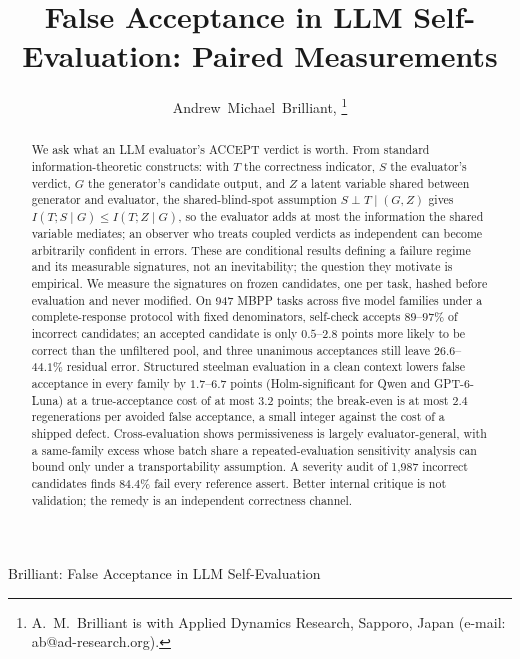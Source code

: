 \documentclass[a4paper,journal]{IAENGtran}
\begin{document}
\title{False Acceptance in LLM Self-Evaluation: Paired Measurements}

\author{Andrew~Michael~Brilliant,
\thanks{A.~M.~Brilliant is with Applied Dynamics Research, Sapporo, Japan (e-mail: ab@ad-research.org).}%
}

%
{Brilliant: False Acceptance in LLM Self-Evaluation}

\maketitle

\pagestyle{empty}
\thispagestyle{empty}



\begin{abstract}
We ask what an LLM evaluator's ACCEPT verdict is worth. From standard
information-theoretic constructs: with $T$ the correctness indicator, $S$ the
evaluator's verdict, $G$ the generator's candidate output, and $Z$ a latent
variable shared between generator and evaluator, the shared-blind-spot assumption
$S\perp T\mid(G,Z)$ gives
$I(T;S\mid G)\leq I(T;Z\mid G)$, so the evaluator adds at most the information
the shared variable mediates; an observer who treats coupled verdicts as
independent can become arbitrarily confident in errors. These are conditional
results defining a failure regime and its measurable signatures, not an
inevitability; the question they motivate is empirical. We measure the
signatures on frozen candidates, one per task, hashed before evaluation and
never modified. On 947 MBPP tasks across five model families under a
complete-response protocol with fixed denominators, self-check accepts
$89$--$97\%$ of incorrect candidates; an accepted candidate is only
$0.5$--$2.8$ points more likely to be correct than the unfiltered pool, and
three unanimous acceptances still leave $26.6$--$44.1\%$ residual error.
Structured steelman evaluation in a clean context lowers false acceptance in
every family by $1.7$--$6.7$ points (Holm-significant for Qwen and
GPT-6-Luna) at a true-acceptance cost of at most $3.2$ points; the break-even is
at most $2.4$ regenerations per avoided false acceptance, a small integer
against the cost of a shipped defect.
Cross-evaluation shows permissiveness is largely evaluator-general, with a
same-family excess whose batch share a repeated-evaluation sensitivity analysis
can bound only under a transportability assumption. A severity audit of 1,987 incorrect candidates finds $84.4\%$ fail
every reference assert. Better internal critique is not validation; the
remedy is an independent correctness channel.
\end{abstract}
\end{document}
